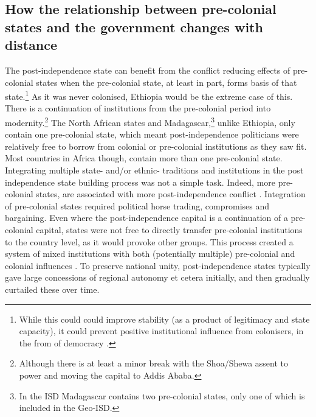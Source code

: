 \subsection{How the relationship between pre-colonial states and the government
changes with distance}
\label{How the relationship between pre-colonial states and the government
changes with distance}

The post-independence state can benefit from the conflict reducing effects of
pre-colonial states when the pre-colonial state, at least in part, forms basis
of that state.\footnote{While this could could improve stability (as a product
	of legitimacy and state capacity), it could prevent positive
institutional influence from colonisers, in the from of democracy
\citep{Hariri2012, Woodberry2012}.} As it was never colonised, Ethiopia would be
the extreme case of this. There is a continuation of institutions from the
pre-colonial period into modernity.\footnote{Although there is at least a minor
break with the Shoa/Shewa assent to power and moving the capital to Addis
Ababa.} The North African states and Madagascar,\footnote{In the ISD Madagascar
contains two pre-colonial states, only one of which is included in the Geo-ISD.}
unlike Ethiopia, only contain one pre-colonial state, which meant
post-independence politicians were relatively free to borrow from colonial or
pre-colonial institutions as they saw fit. Most countries in Africa though,
contain more than one pre-colonial state. Integrating multiple state- and/or
ethnic- traditions and institutions in the post independence state building
process was not a simple task. Indeed, more pre-colonial states, are associated
with more post-independence conflict \citep{Wishman}. Integration of
pre-colonial states required political horse trading, compromises and
bargaining. Even where the post-independence capital is a continuation of a
pre-colonial capital, states were not free to directly transfer pre-colonial
institutions to the country level, as it would provoke other groups. This
process created a system of mixed institutions with both (potentially multiple)
pre-colonial and colonial influences \citep{englebert2013inside}. To preserve
national unity, post-independence states typically gave large concessions of
regional autonomy et cetera initially, and then gradually curtailed these over
time.

